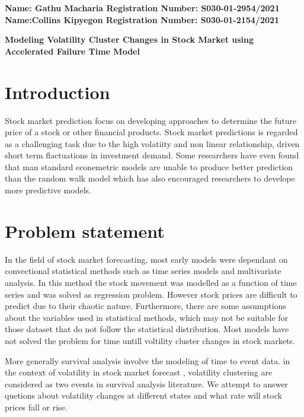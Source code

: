 \documentclass[twoside,a4paper,12pt]{article}
\begin{document}
	
	\begin{flushleft} 
			\large{\bf{Name: Gathu Macharia     Registration Number: S030-01-2954/2021\\
					   Name:Collins Kipyegon        Registration Number: S030-01-2154/2021\\}} \vspace*{0.75in}
	\end{flushleft}
	
	\begin{center} \Large{ \bf{Modeling Volatility Cluster Changes in Stock Market using Accelerated Failure Time Model }} \end{center}	


\section*{Introduction} Stock market prediction focus on developing approaches to determine the future price of a stock or other financial products. Stock market predictions is regarded as a challenging task due to the high volatiity and non linear relationship, driven short term flactuations in investment demand. Some researchers have even found that man standard econemetric models are unable to produce better prediction than the random walk model which has also encouraged researchers to develope more predictive models.



\section*{Problem statement}In the field of stock market forecasting, most early models were dependant on convectional statistical methods such as time series models and multivariate analysis.  In this method the stock movement was modelled as a function of time series and was solved as regression problem. However stock prices are difficult to predict due to their chaotic nature. Furthermore, there are some assumptions about the variables used in statistical methods, which may not be suitable for those dataset that do not follow the statistical distribution. Most models have not  solved the problem for time untill voltility cluster changes in stock markets.

\noindent More generally survival analysis involve the modeling of time to event data. in the context of volatility in stock market forecast , volatility clustering are considered as two events in survival analysis literature. We attempt to answer quetions about volatility changes at different states and what rate will stock prices fall or rise.
\end{document}
